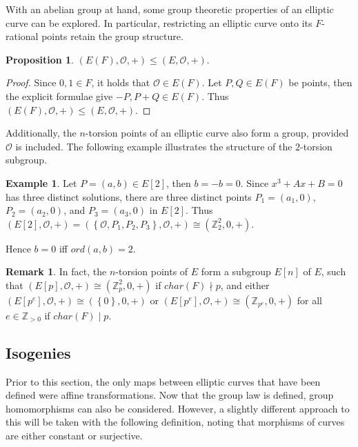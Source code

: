 \documentclass{article}
\newcommand{\Z}{\mathbb{Z}}
\newcommand{\rb}[1]{\left( #1 \right)}
\renewcommand{\sb}[1]{\left[ #1 \right]}
\newcommand{\cb}[1]{\left\{ #1 \right\}}
\theoremstyle{definition}\newtheorem*{definition}{Definition}
\theoremstyle{definition}\newtheorem*{example}{Example}
\theoremstyle{definition}\newtheorem*{remark}{Remark}
\newtheorem{proposition}{Proposition}[subsection]
\begin{document}
With an abelian group at hand, some group theoretic properties of an elliptic curve can be explored. In particular, restricting an elliptic curve onto its $ F $-rational points retain the group structure.

\begin{proposition}
$ \rb{E\rb{F}, \mathcal{O}, +} \le \rb{E, \mathcal{O}, +} $.
\end{proposition}

\begin{proof}
Since $ 0, 1 \in F $, it holds that $ \mathcal{O} \in E\rb{F} $. Let $ P, Q \in E\rb{F} $ be points, then the explicit formulae give $ -P, P + Q \in E\rb{F} $. Thus $ \rb{E\rb{F}, \mathcal{O}, +} \le \rb{E, \mathcal{O}, +} $.
\end{proof}

Additionally, the $ n $-torsion points of an elliptic curve also form a group, provided $ \mathcal{O} $ is included. The following example illustrates the structure of the $ 2 $-torsion subgroup.

\begin{example}
Let $ P = \rb{a, b} \in E\sb{2} $, then $ b = -b = 0 $. Since $ x^3 + Ax + B = 0 $ has three distinct solutions, there are three distinct points $ P_1 = \rb{a_1, 0} $, $ P_2 = \rb{a_2, 0} $, and $ P_3 = \rb{a_3, 0} $ in $ E\sb{2} $. Thus $ \rb{E\sb{2}, \mathcal{O}, +} = \rb{\cb{\mathcal{O}, P_1, P_2, P_3}, \mathcal{O}, +} \cong \rb{\Z_2^2, 0, +} $.
\end{example}

Hence $ b = 0 $ iff $ ord\rb{a, b} = 2 $.

\begin{remark}
In fact, the $ n $-torsion points of $ E $ form a subgroup $ E\sb{n} $ of $ E $, such that $ \rb{E\sb{p}, \mathcal{O}, +} \cong \rb{\Z_p^2, 0, +} $ if $ char\rb{F} \nmid p $, and either $ \rb{E\sb{p^e}, \mathcal{O}, +} \cong \rb{\cb{0}, 0, +} $ or $ \rb{E\sb{p^e}, \mathcal{O}, +} \cong \rb{\Z_{p^e}, 0, +} $ for all $ e \in \Z_{> 0} $ if $ char\rb{F} \mid p $.
\end{remark}

\pagebreak

\subsection{Isogenies}

Prior to this section, the only maps between elliptic curves that have been defined were affine transformations. Now that the group law is defined, group homomorphisms can also be considered. However, a slightly different approach to this will be taken with the following definition, noting that morphisms of curves are either constant or surjective.
\end{document}
